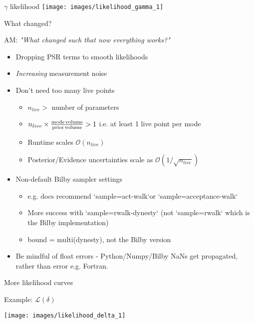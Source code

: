 \documentclass[10pt]{beamer}
\begin{document}
\begin{frame}{$\gamma$ likelihood}
	\texttt{[image: images/likelihood\_gamma\_1]}
\end{frame}


	\begin{frame}{What changed?}
		
		AM: \textit{"What changed such that now everything works?"}
		
		\begin{itemize}
			\item Dropping PSR terms to smooth likelihoods
			\item \textit{Increasing} measurement noise  
			\item Don't need too many live points
			\begin{itemize}
				\item $n_{live} > $ number of parameters 
				\item $n_{live} \times \frac{\rm mode \, volume}{\rm prior \, volume} > 1 $ i.e. at least 1 live point per mode
				\item Runtime scales $\mathcal{O}(n_{live})$
				\item Posterior/Evidence uncertainties scale as $\mathcal{O}(1 / \sqrt{n_{live}})$
			\end{itemize}
			
			\item Non-default Bilby sampler settings 
			\begin{itemize}
				\item e.g. docs recommend `sample=act-walk`or `sample=acceptance-walk`
				\item More success with `sample=rwalk-dynesty` (not `sample=rwalk` which is the Bilby implementation)
				\item bound = multi(dynesty), not the Bilby version 
			\end{itemize}
		\item Be mindful of float errors - Python/Numpy/Bilby NaNs get propagated, rather than error e.g. Fortran.
		\end{itemize}
	

	
\end{frame}



\begin{frame}{More likelihood curves}
	
	Example: $\mathcal{L}(\delta)$
	
\texttt{[image: images/likelihood\_delta\_1]}
	
	
\end{frame}
\end{document}
